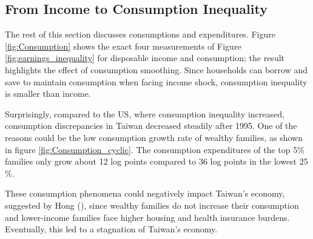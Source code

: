 \documentclass{article}
\begin{document}
\subsection{From Income to Consumption Inequality}

The rest of this section discusses consumptions and expenditures. Figure \ref{fig:Consumption} shows the exact four measurements of Figure \ref{fig:earnings_inequality} for disposable income and consumption; the result highlights the effect of consumption smoothing. Since households can borrow and save to maintain consumption when facing income shock, consumption inequality is smaller than income.

Surprisingly, compared to the US, where consumption inequality increased, consumption discrepancies in Taiwan decreased steadily after 1995. One of the reasons could be the low consumption growth rate of wealthy families, as shown in figure \ref{fig:Consumption_cyclic}. The consumption expenditures of the top 5\% families only grow about 12 log points compared to 36 log points in the lowest 25 \%. 

These consumption phenomena could negatively impact Taiwan's economy, suggested by Hong (\citeyear{TW_stable_dist}), since wealthy families do not increase their consumption and lower-income families face higher housing and health insurance burdens. Eventually, this led to a stagnation of Taiwan's economy.
\end{document}
